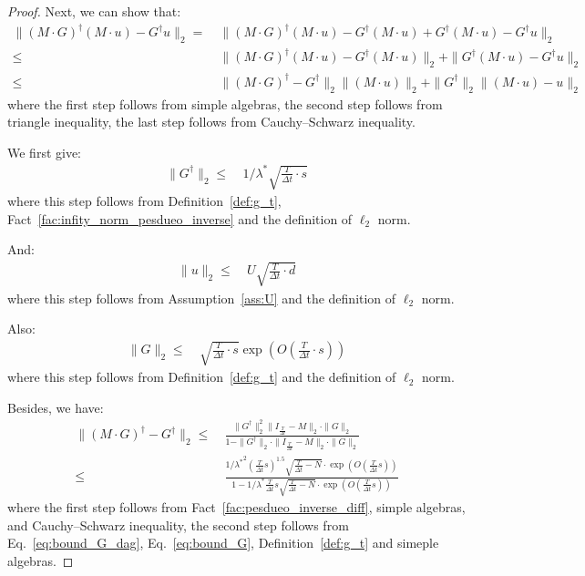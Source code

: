 \begin{proof}
    Next, we can show that:
    \begin{align*}
        \| (M \cdot G)^\dagger (M \cdot u) - G^\dagger u \|_2
        = & ~ \| (M \cdot G)^\dagger (M \cdot u) - G^\dagger (M \cdot u) + G^\dagger (M \cdot u) - G^\dagger u \|_2 \\
        \leq &~ \| (M \cdot G)^\dagger (M \cdot u)  - G^\dagger (M \cdot u) \|_2 + \| G^\dagger (M \cdot u) - G^\dagger u \|_2 \\
        \leq & ~ \| (M \cdot G)^\dagger - G^\dagger \|_2 \| (M \cdot u) \|_2 + \| G^\dagger \|_2 \| (M \cdot u) -  u \|_2
    \end{align*}
    where the first step follows from simple algebras, the second step follows from triangle inequality, the last step follows from Cauchy–Schwarz inequality.

    We first give:
    \begin{align}\label{eq:bound_G_dag}
        \| G^\dagger\|_2 \leq &~ 1/\lambda^* \sqrt{\frac{T}{\Delta t} \cdot s}
    \end{align}
    where this step follows from Definition~\ref{def:g_t}, Fact~\ref{fac:infity_norm_pesdueo_inverse} and the definition of $\ell_2$ norm.

    And:
    \begin{align*}
        \| u\|_2 \leq & ~ U \sqrt{\frac{T}{\Delta t} \cdot d}
    \end{align*}
    where this step follows from Assumption~\ref{ass:U} and the definition of $\ell_2$ norm.

    Also:
    \begin{align}\label{eq:bound_G}
        \| G\|_2 \leq & ~ \sqrt{\frac{T}{\Delta t} \cdot s} \exp( O(\frac{T}{\Delta t} \cdot s) ) 
    \end{align}
   where this step follows from Definition~\ref{def:g_t} and the definition of $\ell_2$ norm.

    Besides, we have:
    \begin{align*}
        \| (M \cdot G)^\dagger - G^\dagger \|_2
        \leq & ~ \frac{\| G^\dagger\|_2^2 \| I_{\frac{T}{\Delta t}} - M\|_2 \cdot \| G\|_2}{1 - \| G^\dagger\|_2 \cdot \| I_{\frac{T}{\Delta t}} - M\|_2 \cdot \| G\|_2} \\
        \leq & ~ \frac{{1/\lambda^*}^2 (\frac{T}{\Delta t} s)^{1.5} \sqrt{\frac{T}{\Delta t} - N} \cdot \exp(O(\frac{T}{\Delta t}s))}{1 - {1/\lambda^*} \frac{T}{\Delta t} s \sqrt{\frac{T}{\Delta t} - N}\cdot \exp(O(\frac{T}{\Delta t}s)) }
    \end{align*}
    where the first step follows from Fact~\ref{fac:pesdueo_inverse_diff}, simple algebras, and Cauchy–Schwarz inequality, the second step follows from Eq.~\eqref{eq:bound_G_dag}, Eq.~\eqref{eq:bound_G}, Definition~\ref{def:g_t} and simeple algebras.


\end{proof}
